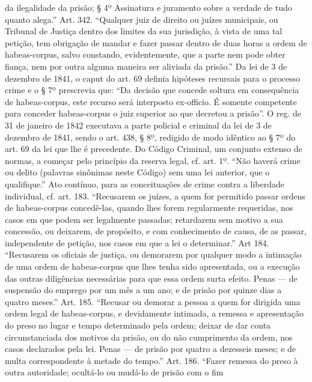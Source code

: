 {  da ilegalidade da prisão; § 4º Assinatura e juramento sobre a verdade
  de tudo quanto alega.'' Art. 342. ``Qualquer juiz de direito ou juízes
  municipais, ou Tribunal de Justiça dentro dos limites da sua
  jurisdição, à vista de uma tal petição, tem obrigação de mandar e
  fazer passar dentro de duas horas a ordem de habeas-corpus, salvo
  constando, evidentemente, que a parte nem pode obter fiança, nem por
  outra alguma maneira ser aliviada da prisão.'' Da lei de 3 de dezembro de 1841, o
  caput do art. 69 definia hipóteses recursais para o processo crime e o
  § 7º prescrevia que: ``Da decisão que concede soltura em consequência
  de habeas-corpus, este recurso será interposto ex-officio. É somente
  competente para conceder habeas-corpus o juiz superior ao que decretou
  a prisão''. O reg. de 31 de janeiro de 1842 executava a parte policial e criminal
  da lei de 3 de dezembro de 1841, sendo o art. 438, § 8º, redigido de modo
  idêntico ao § 7º do art. 69 da lei que lhe é precedente. Do Código
  Criminal, um conjunto extenso de normas, a começar pelo princípio da
  reserva legal, cf. art. 1º. ``Não haverá crime ou delito (palavras
  sinônimas neste Código) sem uma lei anterior, que o qualifique.'' Ato
  contínuo, para as conceituações de crime contra a liberdade
  individual, cf. art. 183. ``Recusarem os juízes, a quem for permitido
  passar ordens de habeas-corpus concedê-las, quando lhes forem
  regularmente requeridas, nos casos em que podem ser legalmente
  passadas; retardarem sem motivo a sua concessão, ou deixarem, de
  propósito, e com conhecimento de causa, de as passar, independente de
  petição, nos casos em que a lei o determinar.'' Art 184. ``Recusarem
  os oficiais de justiça, ou demorarem por qualquer modo a intimação de
  uma ordem de habeas-corpus que lhes tenha sido apresentada, ou a
  execução das outras diligências necessárias para que essa ordem surta
  efeito. Penas --- de suspensão do emprego por um mês a um ano; e de
  prisão por quinze dias a quatro meses.'' Art. 185. ``Recusar ou
  demorar a pessoa a quem for dirigida uma ordem legal de habeas-corpus,
  e devidamente intimada, a remessa e apresentação do preso no lugar e
  tempo determinado pela ordem; deixar de dar conta circunstanciada dos
  motivos da prisão, ou do não cumprimento da ordem, nos casos
  declarados pela lei. Penas --- de prisão por quatro a dezesseis meses; e
  de multa correspondente à metade do tempo.'' Art. 186. ``Fazer remessa
  do preso à outra autoridade; ocultá-lo ou mudá-lo de prisão com o fim
}
